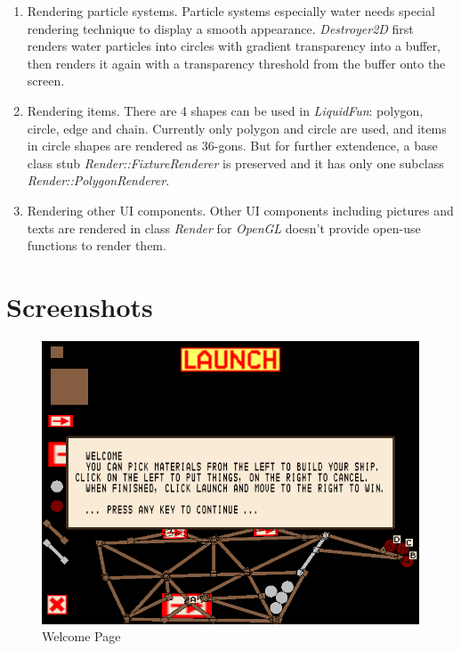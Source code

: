 \documentclass[UTF8]{ctexart}
\begin{document}
            \begin{enumerate}
                \item Rendering particle systems. Particle systems especially water needs special rendering technique to display a smooth appearance. \textit{Destroyer2D} first renders water particles into circles with gradient transparency into a buffer, then renders it again with a transparency threshold from the buffer onto the screen.
                \item Rendering items. There are 4 shapes can be used in \textit{LiquidFun}: polygon, circle, edge and chain. Currently only polygon and circle are used, and items in circle shapes are rendered as 36-gons. But for further extendence, a base class stub \textit{Render::FixtureRenderer} is preserved and it has only one subclass \textit{Render::PolygonRenderer}.
                \item Rendering other UI components. Other UI components including pictures and texts are rendered in class \textit{Render} for \textit{OpenGL} doesn't provide open-use functions to render them.
            \end{enumerate}

    \section{Screenshots}

            \begin{figure}[H]
                \centering
                \includegraphics[width=.8\textwidth]{welcome_page.png}
                \caption{Welcome Page}
            \end{figure}
\end{document}
